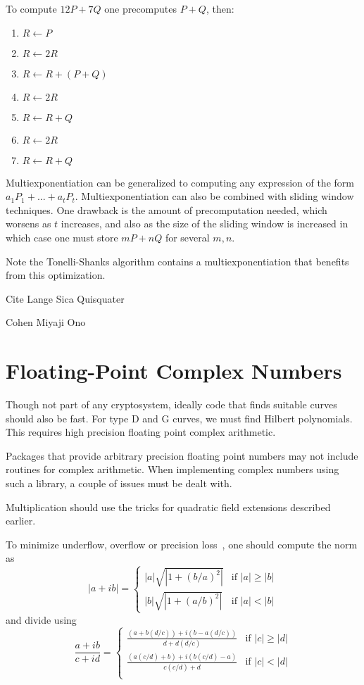 To compute $12 P + 7 Q$ one precomputes $P + Q$, then:

\begin{enumerate}
\item
$R \leftarrow P$
\item
$R \leftarrow 2R$
\item
$R \leftarrow R + (P + Q)$
\item
$R \leftarrow 2R$
\item
$R \leftarrow R + Q$
\item
$R \leftarrow 2R$
\item
$R \leftarrow R + Q$
\end{enumerate}

Multiexponentiation can
be generalized to computing any expression of the form
$a_1 P_1 + ... + a_t P_t$. Multiexponentiation can also be combined with
sliding window techniques.
One drawback is the amount of precomputation needed,
which worsens as $t$ increases, and also as the size of the sliding window
is increased in which case one must store $m P + n Q$ for several $m, n$.

Note the Tonelli-Shanks algorithm contains a multiexponentiation
that benefits from this optimization.

Cite Lange Sica Quisquater

Cohen Miyaji Ono

\section{Floating-Point Complex Numbers}

Though not part of any cryptosystem, ideally code that finds suitable
curves should also be fast. For type D and G curves, we must
find Hilbert polynomials. This requires high precision
floating point complex arithmetic.

Packages that provide arbitrary precision floating point numbers
may not include routines for complex arithmetic. When implementing
complex numbers using such a library, a couple of issues must be
dealt with.

Multiplication should use the
tricks for quadratic field extensions described earlier.

To minimize underflow, overflow or precision loss~\cite{numericalrecipes},
one should compute the norm as
\[
|a+ib| = \left\{
\begin{array}{ll}
|a|\sqrt{|1+(b/a)^2|} & \mbox{if $|a| \ge |b|$} \\
|b|\sqrt{|1+(a/b)^2|} & \mbox{if $|a| < |b|$}
\end{array}
\right.
\]
and divide using
\[
\frac{a+ib}{c+id} =
\left\{\begin{array}{ll}
\frac{(a+b(d/c))+i(b-a(d/c))}{d+d(d/c)} & \mbox{if $|c|\ge|d|$} \\
\frac{(a(c/d) + b)+i(b(c/d)-a)}{c(c/d)+d} & \mbox{if $|c|<|d|$} \\
\end{array}\right.
\]
